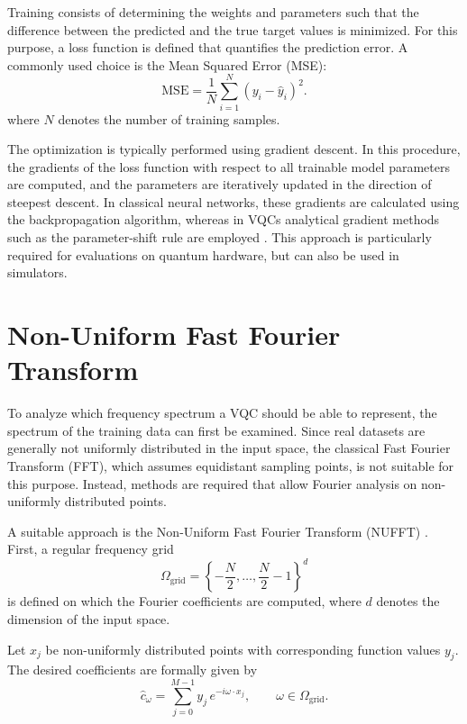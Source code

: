 Training consists of determining the weights and parameters such that the difference between the predicted and the true target values is minimized. For this purpose, a loss function is defined that quantifies the prediction error. A commonly used choice is the Mean Squared Error (MSE):
\begin{equation}
\text{MSE} = \frac{1}{N} \sum_{i=1}^{N} (y_i - \hat{y}_i)^2.
\end{equation}
where $N$ denotes the number of training samples.

The optimization is typically performed using gradient descent. In this procedure, the gradients of the loss function with respect to all trainable model parameters are computed, and the parameters are iteratively updated in the direction of steepest descent. In classical neural networks, these gradients are calculated using the backpropagation algorithm, whereas in VQCs analytical gradient methods such as the parameter-shift rule are employed \cite{schuld2019evaluating}. This approach is particularly required for evaluations on quantum hardware, but can also be used in simulators.


\section{Non-Uniform Fast Fourier Transform}
\label{sec:bg-nufft}

To analyze which frequency spectrum a VQC should be able to represent,
the spectrum of the training data can first be examined.
Since real datasets are generally not uniformly distributed in the input space,
the classical Fast Fourier Transform (FFT), which assumes equidistant
sampling points, is not suitable for this purpose.
Instead, methods are required that allow Fourier analysis
on non-uniformly distributed points.

A suitable approach is the Non-Uniform Fast Fourier Transform
(NUFFT) \cite{dutt1993fast}.
First, a regular frequency grid
\begin{equation}
\Omega_{\text{grid}} =
\left\{
-\frac{N}{2}, \ldots, \frac{N}{2}-1
\right\}^d
\end{equation}
is defined on which the Fourier coefficients are computed,
where $d$ denotes the dimension of the input space.

Let $x_j$ be non-uniformly distributed points with corresponding
function values $y_j$.
The desired coefficients are formally given by
\begin{equation}
\hat{c}_\omega
=
\sum_{j=0}^{M-1}
y_j \, e^{- i \omega \cdot x_j},
\qquad \omega \in \Omega_{\text{grid}}.
\end{equation}

